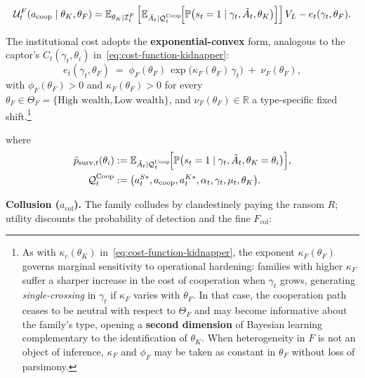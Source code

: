 \documentclass[12pt,a4paper]{article}
\theoremstyle{plain}
\theoremstyle{definition}
\theoremstyle{remark}
\newcommand{\ProbE}{\mathbb{P}}
\newcommand{\E}{\mathbb{E}}
\newcommand{\1}{\mathbf{1}}
\begin{document}
\begin{equation}
    \label{eq:family-utility-coop}
    \mathcal{U}^F_t(a_{\mathrm{coop}}\mid \theta_K,\theta_F)
    =
    \E_{\theta_K \mid \mathcal{I}_t^F}
    \left[
    \E_{\tilde A_t \mid \mathcal Q_t^{\mathrm{Coop}}}\!\Bigl[
      \ProbE\bigl(s_t=1\mid \gamma_t,\tilde A_t,\theta_K\bigr)
    \Bigr]
    \right] V_L
    - e_t(\gamma_t,\theta_F).
\end{equation}

\noindent The institutional cost adopts the \textbf{exponential-convex} form, analogous to the captor's $C_t(\gamma_t,\theta_i)$ in~\eqref{eq:cost-function-kidnapper}:
\begin{equation}
    \label{eq:family-institutional-cost}
    e_t(\gamma_t,\theta_F)
    \;=\;
    \phi_F(\theta_F)\,\exp\bigl(\kappa_F(\theta_F)\,\gamma_t\bigr)
    \;+\;
    \nu_F(\theta_F),
\end{equation}
with $\phi_F(\theta_F)>0$ and $\kappa_F(\theta_F)>0$ for every $\theta_F\in\Theta_F=\{\text{High wealth},\text{Low wealth}\}$, and $\nu_F(\theta_F)\in\mathbb{R}$ a type-specific fixed shift.\footnote{As with $\kappa_c(\theta_K)$ in~\eqref{eq:cost-function-kidnapper}, the exponent $\kappa_F(\theta_F)$ governs marginal sensitivity to operational hardening: families with higher $\kappa_F$ suffer a sharper increase in the cost of cooperation when $\gamma_t$ grows, generating \textit{single-crossing} in $\gamma_t$ if $\kappa_F$ varies with $\theta_F$. In that case, the cooperation path ceases to be neutral with respect to $\Theta_F$ and may become informative about the family's type, opening a \textbf{second dimension} of Bayesian learning complementary to the identification of $\theta_K$. When heterogeneity in $F$ is not an object of inference, $\kappa_F$ and $\phi_F$ may be taken as constant in $\theta_F$ without loss of parsimony.}

\noindent where
\[
\begin{aligned}
\tilde p_{\mathrm{surv},t}(\theta_i)
&:=
\E_{\tilde A_t \mid \mathcal Q_t^{\mathrm{Coop}}}\!\Bigl[
\ProbE\bigl(s_t=1\mid \gamma_t,\tilde A_t,\theta_K=\theta_i\bigr)
\Bigr], \\
\mathcal Q_t^{\mathrm{Coop}}
&:=
\bigl(a_t^{S\ast},a_{\mathrm{coop}},a_t^{K\ast},\alpha_t,\gamma_t,\mu_t,\theta_K\bigr).
\end{aligned}
\]

\noindent \textbf{Collusion ($a_{\mathrm{col}}$).} The family colludes by clandestinely paying the ransom $R$; utility discounts the probability of detection and the fine $F_{\mathrm{col}}$:
\end{document}
